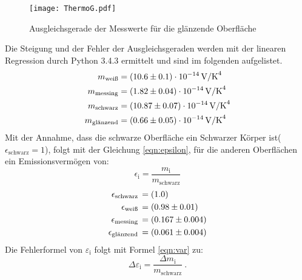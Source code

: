 \begin{figure}[H]
  \centering
  \texttt{[image: ThermoG.pdf]}
  \caption{Ausgleichsgerade der Messwerte für die glänzende Oberfläche}
  \label{fig:ThermoG}
\end{figure}
Die Steigung und der Fehler der Ausgleichsgeraden werden mit der linearen Regression durch Python 3.4.3 ermittelt und sind im folgenden aufgelistet.
\begin{align*}
  m_\text{weiß}     &= (\num{10.6 +- 0.1})   \cdot 10^{-14} \, \text{V/K}^4 \\
  m_\text{messing}  &= (\num{1.82 +- 0.04})  \cdot 10^{-14} \, \text{V/K}^4 \\
  m_\text{schwarz}  &= (\num{10.87 +- 0.07}) \cdot 10^{-14} \, \text{V/K}^4 \\
  m_\text{glänzend} &= (\num{0.66 +- 0.05})  \cdot 10^{-14} \, \text{V/K}^4 \\
\end{align*}
Mit der Annahme, dass die schwarze Oberfläche ein Schwarzer Körper ist($\epsilon_\text{schwarz} = 1$), folgt mit der Gleichung \ref{eqn:epsilon}, für die anderen Oberflächen ein Emissionsvermögen von:
\begin{equation}
  \epsilon_\text{i} = \frac{m_\text{i}}{m_\text{schwarz}}
  \label{eqn:epsilon}
\end{equation}
\begin{align*}
  \epsilon_\text{schwarz}  \, &= (\num{1.0 +- 0.0})     \\
  \epsilon_\text{weiß}     \, &= (\num{0.98 +- 0.01})   \\
  \epsilon_\text{messing}  \, &= (\num{0.167 +- 0.004}) \\
  \epsilon_\text{glänzend} \, &= (\num{0.061 +- 0.004}) \\
\end{align*}
Die Fehlerformel von $\varepsilon_\text{i}$ folgt mit Formel \ref{eqn:var} zu:
\begin{equation}
  \Delta \varepsilon_\text{i} = \frac{\Delta m_\text{i}}{m_\text{schwarz}} \ .
\end{equation}

